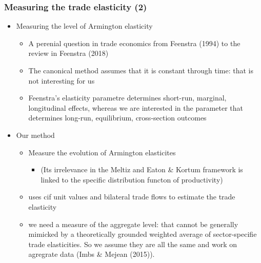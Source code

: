 \documentclass{beamer}
\begin{document}
\begin{frame}\frametitle{Measuring the trade elasticity (2)}	
	\begin{itemize}
		\item Measuring the level of Armington elasticity
		\begin{itemize}
			\item A perenial question in trade economics from Feenstra (1994) to the review in Feenstra (2018)
			\item The canonical method assumes that it is constant through time: that is not interesting for us
			\item Feenstra's elasticity parametre determines short-run, marginal, longitudinal effects, whereas we are interested in the parameter that determines long-run, equilibrium, cross-section outcomes
		\end{itemize}
		\item Our method
		\begin{itemize}
			\item Measure the evolution of Armington elasticites
			\begin{itemize}
				\item (Its irrelevance in the Meltiz and Eaton \& Kortum framework is linked to the specific distribution functon of productivity)
			\end{itemize}
			\item uses cif unit values and bilateral trade flows to estimate the trade elasticity
			\item we need a measure of the aggregate level: that cannot be generally mimicked by a theoretically grounded weighted average of sector-specifie trade elasticities. So we assume they are all the same and work on agregrate data (Imbs \& Mejean (2015)).
		\end{itemize}
	\end{itemize}
\end{frame}	
\end{document}
